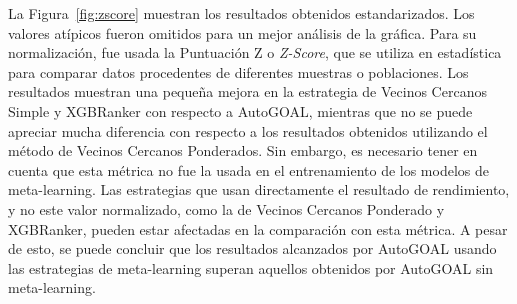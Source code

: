 \documentclass[a4paper,12pt]{article}
\begin{document}
La Figura~\ref{fig:zscore} muestran los resultados obtenidos estandarizados. Los valores atípicos fueron omitidos para un mejor análisis de la gráfica. Para su normalización, fue usada la Puntuación Z o \textit{Z-Score}, que se utiliza en estadística para comparar datos procedentes de diferentes muestras o poblaciones.
Los resultados muestran una pequeña mejora en la estrategia de Vecinos Cercanos Simple y XGBRanker con respecto a AutoGOAL, mientras que no se puede apreciar mucha diferencia con respecto a los resultados obtenidos utilizando el método de Vecinos Cercanos Ponderados. Sin embargo, es necesario tener en cuenta que esta métrica no fue la usada en el entrenamiento de los modelos de meta-learning. Las estrategias que usan directamente el resultado de rendimiento, y no este valor normalizado, como la de Vecinos Cercanos Ponderado y XGBRanker, pueden estar afectadas en la comparación con esta métrica. A pesar de esto, se puede concluir que los resultados alcanzados por AutoGOAL usando las estrategias de meta-learning superan aquellos obtenidos por AutoGOAL sin meta-learning.



\end{document}
